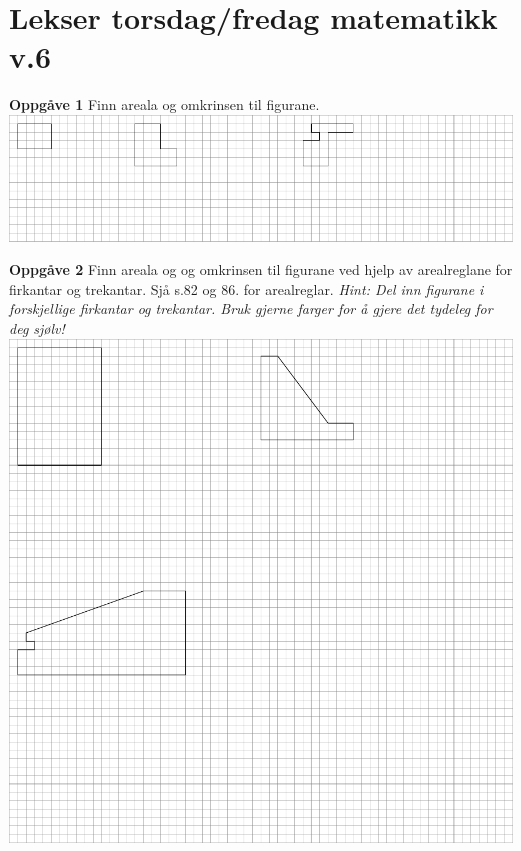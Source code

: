 


\section*{Lekser torsdag/fredag matematikk v.6}
\textbf{Oppgåve 1}	\os
Finn areala og omkrinsen til figurane. \os
\includegraphics[]{o1} \vsk 

\textbf{Oppgåve 2}	\os
Finn areala og og omkrinsen til figurane ved hjelp av arealreglane for firkantar og trekantar. \os
Sjå  s.82 og 86. for arealreglar. \os
 \textit{Hint: Del inn figurane i forskjellige firkantar og trekantar. Bruk gjerne farger for å gjere det tydeleg for deg sjølv!}  \os
\includegraphics[]{o2}




